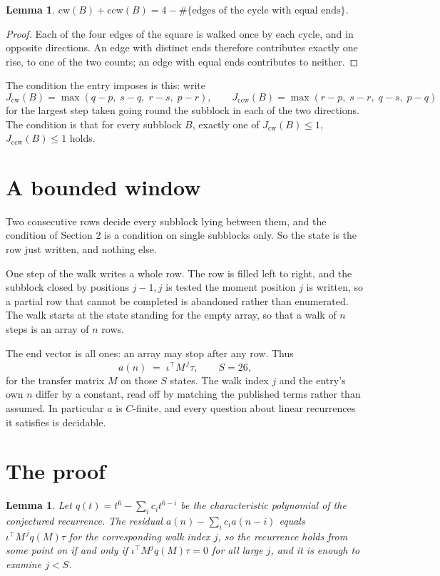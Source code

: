 \documentclass[11pt,a4paper]{article}
\theoremstyle{plain}
\newtheorem{lemma}[theorem]{Lemma}
\theoremstyle{definition}
\begin{document}
\begin{lemma}\label{lem:sum}
$\mathrm{cw}(B)+\mathrm{ccw}(B)=4-\#\{\text{edges of the cycle with equal ends}\}$.
\end{lemma}

\begin{proof}
Each of the four edges of the square is walked once by each cycle, and in opposite directions.
An edge with distinct ends therefore contributes exactly one rise, to one of the two counts;
an edge with equal ends contributes to neither.
\end{proof}

The condition the entry imposes is this: write
\[
J_{\mathrm{cw}}(B)=\max(q-p,\;s-q,\;r-s,\;p-r),\qquad J_{\mathrm{ccw}}(B)=\max(r-p,\;s-r,\;q-s,\;p-q)
\]
for the largest step taken going round the subblock in each of the two directions. The condition is that for every subblock $B$, exactly one of $J_{\mathrm{cw}}(B)\le 1$, $J_{\mathrm{ccw}}(B)\le 1$ holds.

\section{A bounded window}

Two consecutive rows decide every subblock lying between them, and the condition of Section 2 is a condition on single subblocks only. So the state is the row just written, and nothing else.

One step of the walk writes a whole row. The row is filled left to right, and the subblock
closed by positions $j-1,j$ is tested the moment position $j$ is written, so a partial row that
cannot be completed is abandoned rather than enumerated. The walk starts at the state standing
for the empty array, so that a walk of $n$ steps is an array of $n$ rows.

The end vector is all ones: an array may stop after any row. Thus
\[
a(n)\;=\;\iota^{\!\top}M^{\,j}\tau ,\qquad S=26,
\]
for the transfer matrix $M$ on those $S$ states. The walk index $j$ and the entry's own $n$
differ by a constant, read off by matching the published terms rather than assumed. In
particular $a$ is $C$-finite, and every question about linear recurrences it satisfies is
decidable.

\section{The proof}

\begin{lemma}\label{lem:crit}
Let $q(t)=t^{6}-\sum_i c_it^{6-i}$ be the characteristic polynomial of the
conjectured recurrence. The residual $a(n)-\sum_ic_ia(n-i)$ equals
$\iota^{\!\top}M^{\,j}q(M)\tau$ for the corresponding walk index $j$, so the recurrence
holds from some point on if and only if $\iota^{\!\top}M^{j}q(M)\tau=0$ for all large $j$,
and it is enough to examine $j<S$.
\end{lemma}
\end{document}
